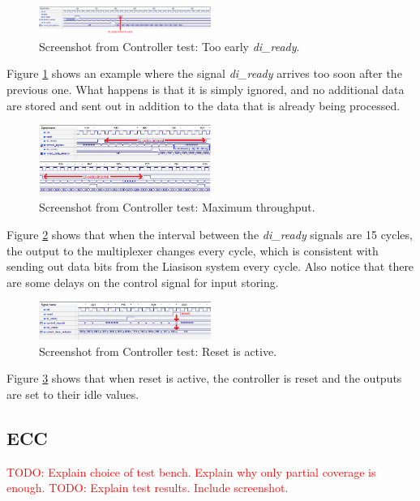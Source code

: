 \documentclass[a4paper]{IEEEtran}
\newcommand\TODO[1]{\textcolor{red}{TODO:#1}}
\newcommand\todo[1]{\TODO{#1}}
\begin{document}
\begin{figure}[h!]
  \centering
      \includegraphics[width=0.5\textwidth]{Figures/Tests/ControllerTooEarlyDiReady}
  \caption{Screenshot from Controller test: Too early \textit{di\_ready}.}
  \label{fig:ControllerTooEarlyDiReady}
\end{figure}
Figure \ref{fig:ControllerTooEarlyDiReady} shows an example where the signal \textit{di\_ready} arrives too soon after the previous one.
What happens is that it is simply ignored, and no additional data are stored and sent out in addition to the data that is already being processed.

\begin{figure}[h!]
  \centering
      \includegraphics[width=0.5\textwidth]{Figures/Tests/ControllerThroughput}
  \caption{Screenshot from Controller test: Maximum throughput.}
  \label{fig:ControllerThroughput}
\end{figure}
Figure \ref{fig:ControllerThroughput} shows that when the interval between the \textit{di\_ready} signals are 15 cycles, the output to the multiplexer changes every cycle, which is consistent with sending out data bits from the Liasison system every cycle.
Also notice that there are some delays on the control signal for input storing.

\begin{figure}[h!]
  \centering
      \includegraphics[width=0.5\textwidth]{Figures/Tests/ControllerReset}
  \caption{Screenshot from Controller test: Reset is active.}
  \label{fig:ControllerReset}
\end{figure}
Figure \ref{fig:ControllerReset} shows that when reset is active, the controller is reset and the outputs are set to their idle values.

\subsection{ ECC }
\todo{ Explain choice of test bench. Explain why only partial coverage is enough. }
\break
\break
\todo{ Explain test results. Include screenshot. }
\end{document}
